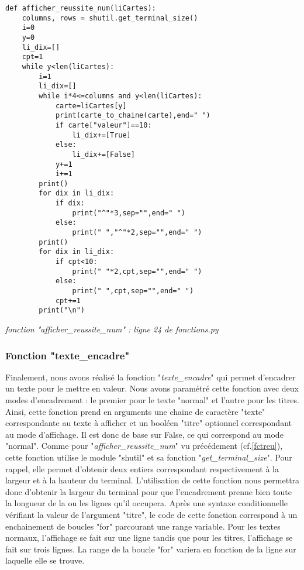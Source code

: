 \documentclass[10pt,a4paper,french,titlepage]{article}
\theoremstyle{definition}
\begin{document}
\begin{lstlisting}
def afficher_reussite_num(liCartes):
    columns, rows = shutil.get_terminal_size()
    i=0
    y=0
    li_dix=[]
    cpt=1
    while y<len(liCartes):
        i=1
        li_dix=[]
        while i*4<=columns and y<len(liCartes): 
            carte=liCartes[y]
            print(carte_to_chaine(carte),end=" ")
            if carte["valeur"]==10:
                li_dix+=[True]
            else:
                li_dix+=[False]
            y+=1
            i+=1
        print()
        for dix in li_dix:
            if dix:
                print("^"*3,sep="",end=" ")
            else:
                print(" ","^"*2,sep="",end=" ")
        print()
        for dix in li_dix:
            if cpt<10:
                print(" "*2,cpt,sep="",end=" ")
            else:
                print(" ",cpt,sep="",end=" ")
            cpt+=1
        print("\n")
\end{lstlisting}
\begin{center}
\textit{fonction "afficher\_reussite\_num" : ligne 24 de fonctions.py}
\end{center}

\subsubsection{Fonction "texte\_encadre"}
Finalement, nous avons réalisé la fonction "\textit{texte\_encadre}" qui permet d'encadrer un texte pour le mettre en valeur. Nous avons paramétré cette fonction avec deux modes d’encadrement : le premier pour le texte "normal" et l'autre pour les titres. Ainsi, cette fonction prend en arguments une chaine de caractère "texte" correspondante au texte à afficher et un booléen "titre" optionnel correspondant au mode d'affichage. Il est donc de base sur False, ce qui correspond au mode "normal". Comme pour "\textit{afficher\_reussite\_num}" vu précédement  (cf.\ref{fctreu}), cette fonction utilise le module "shutil" et sa fonction "\textit{get\_terminal\_size}". Pour rappel, elle permet d'obtenir deux entiers correspondant respectivement à la largeur et à la hauteur du terminal. L'utilisation de cette fonction nous permettra donc d'obtenir la largeur du terminal pour que l'encadrement prenne bien toute la longueur de la ou les lignes qu'il occupera. Après une syntaxe conditionnelle vérifiant la valeur de l'argument "titre", le code de cette fonction correspond à un enchainement de boucles "for" parcourant une range variable. Pour les textes normaux, l'affichage se fait sur une ligne tandis que pour les titres, l'affichage se fait sur trois lignes. La range de la boucle "for" variera en fonction de la ligne sur laquelle elle se trouve.
\end{document}

